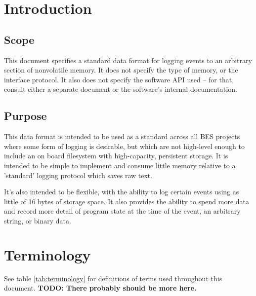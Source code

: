 \documentclass[paper=letter, fontsize=10pt]{scrartcl} %
\numberwithin{equation}{section} %
\numberwithin{figure}{section} %
\numberwithin{table}{section} %
\begin{document}
\tableofcontents

\clearpage

\section{Introduction} \label{sec:introduction}

\subsection{Scope} \label{sec:scope}

This document specifies a standard data format for logging events to an
arbitrary section of nonvolatile memory. It does not specify the type of memory,
or the interface protocol. It also does not specify the software API used -- for
that, consult either a separate document or the software's internal
documentation.

\subsection{Purpose} \label{sec:purpose}

This data format is intended to be used as a standard across all BES projects
where some form of logging is desirable, but which are not high-level enough to
include an on board filesystem with high-capacity, persistent storage. It is
intended to be simple to implement and consume little memory relative to a
'standard' logging protocol which saves raw text.

It's also intended to be flexible, with the ability to log certain events using
as little of 16 bytes of storage space. It also provides the ability to spend
more data and record more detail of program state at the time of the event, an
arbitrary string, or binary data.

\section{Terminology} \label{sec:terminology}

See table \ref{tab:terminology} for definitions of terms used throughout this
document. \textbf{TODO: There probably should be more here.}
\end{document}
